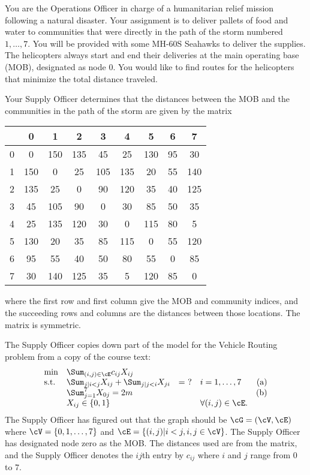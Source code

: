 \documentclass[10pt]{article}
\begin{document}

You are the Operations Officer in charge of a humanitarian relief mission following a natural disaster.  Your assignment is to deliver pallets of food and water to communities that were directly in the path of the storm numbered $1,\ldots, 7$.  You will be provided with some MH-60S Seahawks to deliver the supplies.   The helicopters always start and end their deliveries at the main operating base (MOB), designated as node 0.  You would like to find routes for the helicopters that minimize the total distance traveled. 

Your Supply Officer determines that the distances between the MOB and the communities in the path of the storm are given by the matrix 

\begin{center}
\begin{tabular}{l|cccccccc}
 & 0 & 1 & 2 & 3 & 4 & 5 & 6 & 7\\
\hline
0 & 0	&	150	&	135	&	45	&	25	&	130  & 95 & 30 \\
1 & 150	&	0	&	25	&	105	&	135	&	20 & 55 & 140 \\
2 & 135 & 25	&	0	&	90	&	120	&	35	& 40 & 125 \\
3& 45	&	105	&	90	&	0	&	30	&	85	& 50 & 35 \\
4& 25	&	135	&	120	&	30	&	0	&	115	& 80 & 5 \\
5& 130	&	20	&	35	&	85	&	115	&	0	& 55 & 120 \\
6& 95	&	55	&	40	&	50	&	80	&	55	& 0 & 85\\
7& 30	&	140	&	125	&	35	&	5	&	120	& 85 & 0\\
\end{tabular}
\end{center}

\noindent where the first row and first column give the MOB and community indices, and the succeeding rows and columns are the distances between those locations.  The matrix is symmetric.

The Supply Officer copies down part of the model for the Vehicle Routing problem from a copy of the course text:
\[
\begin{array}{llllr}
  \min & \Sum_{(i,j) \in \cE} c_{ij} X_{ij} & \\
\mbox{s.t.} & \Sum_{j | i < j} X_{ij} + \Sum_{j|j<i} X_{ji} & = \ ? & i =
1,\ldots,7 & (\rm{a}) \\
&  \Sum_{j=1}^{7} X_{0j}  = 2m & & & (\rm{b}) \\
& X_{ij} \in \{0,1\} & & \forall (i,j) \in \cE. &
\end{array}
\]
The Supply Officer has figured out that the graph should be $\cG = (\cV,\cE)$ where $\cV
= \{0,1,\ldots,7\}$ and $\cE = \{ (i,j) | i < j, i,j \in \cV\}$. The Supply Officer
has designated node zero as the MOB. The distances used are from the matrix, and the Supply Officer denotes the $ij$th entry by $c_{ij}$ where $i$ and $j$ range from $0$ to $7$.
\end{document}
